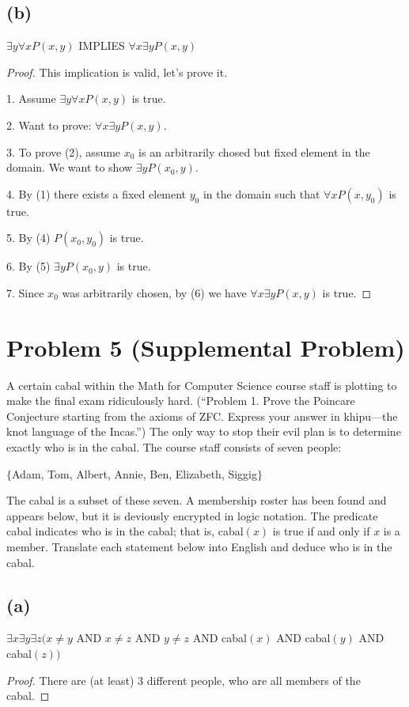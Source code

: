 \documentclass[14pt]{extarticle}
\begin{document}
\subsection{(b)}
$\exists y \forall x P(x, y)$ IMPLIES $\forall x \exists y P(x, y)$
\begin{proof}
    This implication is valid, let's prove it.

    1. Assume $\exists y \forall x P(x, y)$ is true.

    2. Want to prove: $\forall x \exists y P(x, y)$.

    3. To prove (2), assume $x_0$ is an arbitrarily chosed but fixed element in the domain. We want to show $\exists y P(x_0, y)$.

    4. By (1) there exists a fixed element $y_0$ in the domain such that $\forall x P(x, y_0)$ is true.

    5. By (4) $P(x_0, y_0)$ is true.

    6. By (5) $\exists y P(x_0, y)$ is true.

    7. Since $x_0$ was arbitrarily chosen, by (6) we have $\forall x \exists y P(x, y)$ is true.
\end{proof}

\section{Problem 5 (Supplemental Problem)}
A certain cabal within the Math for Computer Science course staff is plotting to make the final exam ridiculously hard. (“Problem 1. Prove the Poincare Conjecture starting from the axioms of ZFC. Express your answer in khipu—the knot language of the Incas.”) The only way to stop their evil plan is to determine exactly who is in the cabal. The course staff consists of seven people:

\begin{center}
    $\{$Adam, Tom, Albert, Annie, Ben, Elizabeth, Siggig$\}$
\end{center}

The cabal is a subset of these seven. A membership roster has been found and appears below, but it is deviously encrypted in logic notation. The predicate cabal indicates who is in the cabal; that is, cabal$(x)$ is true if and only if $x$ is a member. Translate each statement below into English and deduce who is in the cabal.

\subsection{(a)}
$\exists x \exists y \exists z(x \neq y$ AND $x \neq z$ AND $y \neq z$ AND cabal$(x)$ AND cabal$(y)$ AND cabal$(z))$
\begin{proof}
    There are (at least) 3 different people, who are all members of the cabal.
\end{proof}
\end{document}
